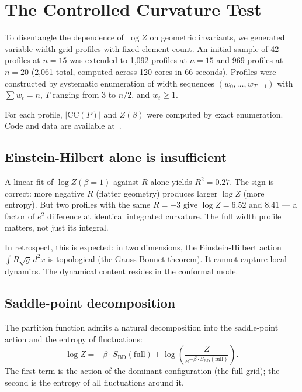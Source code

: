 \documentclass[aps,prd,twocolumn,superscriptaddress]{revtex4-2}
\begin{document}
\section{The Controlled Curvature Test}
\label{sec:curvature}

To disentangle the dependence of $\log Z$ on geometric invariants,
we generated variable-width grid profiles with fixed element count.
An initial sample of 42 profiles at $n = 15$ was extended to
1{,}092 profiles at $n = 15$ and 969 profiles at $n = 20$
(2{,}061 total, computed across 120 cores in 66 seconds).
Profiles were constructed by systematic enumeration of
width sequences $(w_0, \ldots, w_{T-1})$ with $\sum w_t = n$,
$T$ ranging from 3 to $n/2$, and $w_t \geq 1$.

For each profile, $|\mathrm{CC}(P)|$ and $Z(\beta)$ were computed
by exact enumeration. Code and data are available at~\cite{jtrepo}.

\subsection{Einstein-Hilbert alone is insufficient}

A linear fit of $\log Z(\beta{=}1)$ against $R$ alone yields
$R^2 = 0.27$. The sign is correct: more negative $R$ (flatter
geometry) produces larger $\log Z$ (more entropy). But two profiles
with the same $R = -3$ give $\log Z = 6.52$ and $8.41$ --- a factor
of $e^2$ difference at identical integrated curvature. The full width
profile matters, not just its integral.

In retrospect, this is expected: in two dimensions, the
Einstein-Hilbert action $\int R \sqrt{g}\, d^2x$ is topological
(the Gauss-Bonnet theorem). It cannot capture local dynamics. The
dynamical content resides in the conformal mode.

\subsection{Saddle-point decomposition}

The partition function admits a natural decomposition into the
saddle-point action and the entropy of fluctuations:
\begin{equation}
\label{eq:decomp}
\log Z = -\beta \cdot S_{\mathrm{BD}}(\text{full}) + \log\!\left(\frac{Z}{e^{-\beta \cdot S_{\mathrm{BD}}(\text{full})}}\right).
\end{equation}
The first term is the action of the dominant configuration (the full
grid); the second is the entropy of all fluctuations around it.
\end{document}
